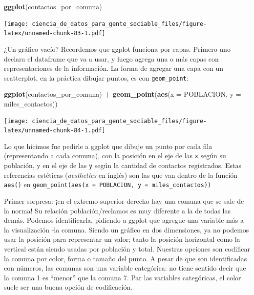 \documentclass[]{book}
\newenvironment{Shaded}{\begin{snugshade}}{\end{snugshade}}
\newcommand{\KeywordTok}[1]{\textcolor[rgb]{0.13,0.29,0.53}{\textbf{#1}}}
\newcommand{\DataTypeTok}[1]{\textcolor[rgb]{0.13,0.29,0.53}{#1}}
\newcommand{\StringTok}[1]{\textcolor[rgb]{0.31,0.60,0.02}{#1}}
\newcommand{\OperatorTok}[1]{\textcolor[rgb]{0.81,0.36,0.00}{\textbf{#1}}}
\newcommand{\NormalTok}[1]{#1}
\begin{document}
\begin{Shaded}
\begin{Highlighting}[]
\KeywordTok{ggplot}\NormalTok{(contactos_por_comuna)}
\end{Highlighting}
\end{Shaded}

\texttt{[image: ciencia\_de\_datos\_para\_gente\_sociable\_files/figure-latex/unnamed-chunk-83-1.pdf]}

¿Un gráfico vacío? Recordemos que ggplot funciona por capas. Primero uno
declara el dataframe que va a usar, y luego agrega una o más capas con
representaciones de la información. La forma de agregar una capa con un
scatterplot, en la práctica dibujar puntos, es con \texttt{geom\_point}:

\begin{Shaded}
\begin{Highlighting}[]
\KeywordTok{ggplot}\NormalTok{(contactos_por_comuna) }\OperatorTok{+}\StringTok{ }\KeywordTok{geom_point}\NormalTok{(}\KeywordTok{aes}\NormalTok{(}\DataTypeTok{x =}\NormalTok{ POBLACION, }\DataTypeTok{y =}\NormalTok{ miles_contactos))}
\end{Highlighting}
\end{Shaded}

\texttt{[image: ciencia\_de\_datos\_para\_gente\_sociable\_files/figure-latex/unnamed-chunk-84-1.pdf]}

Lo que hicimos fue pedirle a ggplot que dibuje un punto por cada fila
(representando a cada comuna), con la posición en el eje de las
\texttt{x} según su población, y en el eje de las \texttt{y} según la
cantidad de contactos registrados. Estas referencias estéticas
(\emph{aesthetics} en inglés) son las que van dentro de la función
\texttt{aes()} en
\texttt{geom\_point(aes(x\ =\ POBLACION,\ y\ =\ miles\_contactos))}

Primer sorpresa: ¡en el extremo superior derecho hay una comuna que se
sale de la norma! Su relación población/reclamos es muy diferente a la
de todas las demás. Podemos identificarla, pidiendo a ggplot que agregue
una variable más a la visualización -la comuna. Siendo un gráfico en dos
dimensiones, ya no podemos usar la posición para representar un valor;
tanto la posición horizontal como la vertical están siendo usadas por
población y total. Nuestras opciones son codificar la comuna por color,
forma o tamaño del punto. A pesar de que son identificadas con números,
las comunas son una variable categórica: no tiene sentido decir que la
comuna 1 es ``menor'' que la comuna 7. Par las variables categóricas, el
color suele ser una buena opción de codificación.
\end{document}
